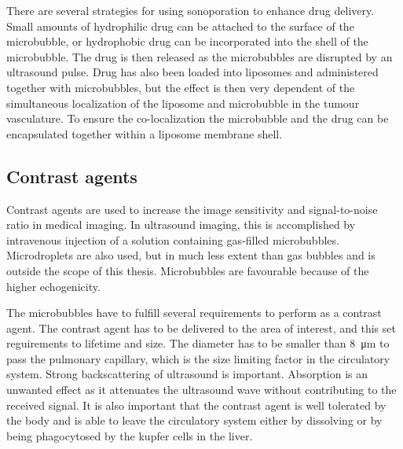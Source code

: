 There are several strategies for using sonoporation to enhance drug delivery. Small amounts of hydrophilic drug can be attached to the surface of the microbubble, or hydrophobic drug can be incorporated into the shell of the microbubble. The drug is then released as the microbubbles are disrupted by an ultrasound pulse\cite{Liu2006}. Drug has also been loaded into liposomes and administered together with microbubbles, but the effect is then very dependent of the simultaneous localization of the liposome and microbubble in the tumour vasculature. To ensure the co-localization the microbubble and the drug can be encapsulated together within a liposome membrane shell\cite{Ibsen2011}. 

  

\subsection{Contrast agents}
\label{contrast agents}

Contrast agents are used to increase the image sensitivity and signal-to-noise ratio in medical imaging. In ultrasound imaging, this is accomplished by intravenous injection of a solution containing gas-filled microbubbles. Microdroplets are also used\cite{Soman2006}, but in much less extent than gas bubbles and is outside the scope of this thesis. Microbubbles are favourable because of the higher echogenicity\cite{Talu2008}.

The microbubbles have to fulfill several requirements to perform as a contrast agent. The contrast agent has to be delivered to the area of interest, and this set reguirements to lifetime and size. The diameter has to be smaller than \SI{8}{\micro\metre} to pass the pulmonary capillary\cite{Tickner1980}, which is the size limiting factor in the circulatory system. Strong backscattering of ultrasound is important. Absorption is an unwanted effect as it attenuates the ultrasound wave without contributing to the received signal. It is also important that the contrast agent is well tolerated by the body and is able to leave the circulatory system either by dissolving or by being phagocytosed by the kupfer cells in the liver\cite{Healey2012}.

